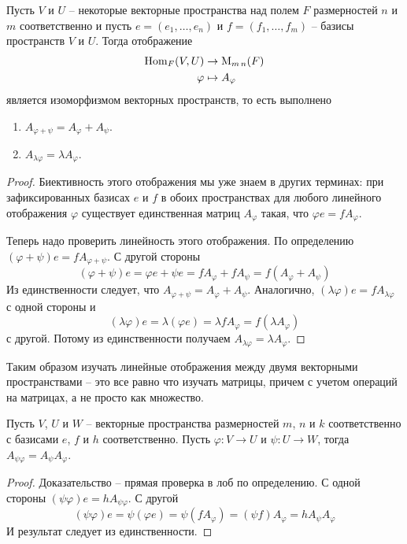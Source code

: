 \begin{claim}
Пусть $V$ и $U$ -- некоторые векторные пространства над полем $F$ размерностей $n$ и $m$ соответственно и пусть $e=(e_1,\ldots,e_n)$ и $f = (f_1,\ldots,f_m)$ -- базисы пространств $V$ и $U$. Тогда отображение
\begin{align*}
\operatorname{Hom}_F (V,U) &\to \operatorname{M}_{m\,n}(F)\\
\varphi &\mapsto A_\varphi
\end{align*}
является изоморфизмом векторных пространств, то есть выполнено
\begin{enumerate}
\item $A_{\varphi + \psi} = A_\varphi + A_\psi$.

\item $A_{\lambda \varphi} = \lambda A_\varphi$.
\end{enumerate}
\end{claim}
\begin{proof}
Биективность этого отображения мы уже знаем в других терминах: при зафиксированных базисах $e$ и $f$ в обоих пространствах для любого линейного отображения $\varphi$ существует единственная матриц $A_\varphi$ такая, что $\varphi e = f A_\varphi$.

Теперь надо проверить линейность этого отображения. По определению
$(\varphi + \psi)e = f A_{\varphi + \psi}$. С другой стороны
\[
(\varphi+\psi)e = \varphi e + \psi e = f A_\varphi + f A_\psi = f(A_\varphi + A_\psi)
\]
Из единственности следует, что $A_{\varphi + \psi} = A_\varphi + A_\psi$. Аналогично, $(\lambda \varphi) e = f A_{\lambda \varphi}$ с одной стороны и
\[
(\lambda \varphi) e = \lambda (\varphi e) = \lambda f A_\varphi = f (\lambda A_\varphi)
\]
с другой. Потому из единственности получаем $A_{\lambda \varphi} = \lambda A_\varphi$.
\end{proof}

Таким образом изучать линейные отображения между двумя векторными пространствами -- это все равно что изучать матрицы, причем с учетом операций на матрицах, а не просто как множество.

\begin{claim}
Пусть $V$, $U$ и $W$ -- векторные пространства размерностей $m$, $n$ и $k$ соответственно с базисами $e$, $f$ и $h$ соответственно. Пусть $\varphi\colon V\to U$ и $\psi \colon U\to W$, тогда $A_{\psi \varphi} = A_\psi A_\varphi$.
\end{claim}
\begin{proof}
Доказательство -- прямая проверка в лоб по определению. С одной стороны $(\psi \varphi) e = h A_{\psi \varphi}$. С другой
\[
(\psi\varphi) e = \psi (\varphi e) = \psi (f A_\varphi) = (\psi f) A_\varphi = h A_\psi A_\varphi
\]
И результат следует из единственности.
\end{proof}

